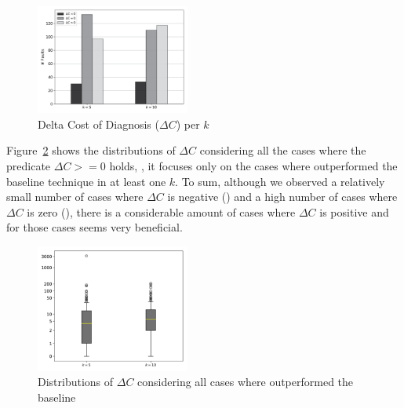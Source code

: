 \documentclass{article}
\begin{document}
\begin{figure}[h]
		\centering
		\includegraphics[width=0.45\textwidth]{figures/performance.png}
		\vspace{-0.4cm}
		\caption{Delta Cost of Diagnosis ($\Delta{}C$) per $k$}
		\label{fig:diagnosis}
\end{figure}


Figure~\ref{fig:boxplot} shows the distributions of $\Delta{}C$ considering all the 
cases where the predicate $\Delta{}C>=0$ holds, \ie{}, it focuses only
on the cases where  outperformed the baseline technique in at least one $k$.
To sum, although we observed a relatively small number of cases where $\Delta{}C$
is negative (\numOutPerformed) and a high number of cases where $\Delta{}C$
is zero (\numEquallyPerformed), there is a
considerable amount of cases where $\Delta{}C$ is positive and for
those cases  seems very beneficial.




\begin{figure}[h]
		\vspace{-0.2cm}
		\centering
		\includegraphics[width=0.45\textwidth]{figures/boxplot.png}
		\vspace{-0.4cm}

		\caption{Distributions of $\Delta{}C$ considering all cases where 
        outperformed the baseline}
		\label{fig:boxplot}
		\vspace{-0.2cm}
\end{figure}
\end{document}
